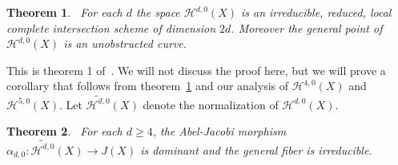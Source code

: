 \documentclass[amssymb,twoside,12 pt,amscd,reqno]{amsart}
\theoremstyle{plain}
\newtheorem{thm}{Theorem}[section]
\theoremstyle{definition}
\newcommand{\Hdg}[2]{\mathcal{H}^{#1,#2}}
\def\ps{\vspace{4pt}}
\begin{document}
\ps

\begin{thm}~\label{thm-irrd0}  For each $d$ the space $\Hdg{d}{0}(X)$
is an irreducible,  reduced, local complete intersection scheme of
dimension $2d$.  Moreover the general point of $\Hdg{d}{0}(X)$ is an
unobstructed curve.   
\end{thm}

This is theorem 1 of~\cite{HRS}.  We will not discuss the proof here,
but we will prove a corollary that follows from
theorem~\ref{thm-irrd0} and our analysis of $\Hdg{4}{0}(X)$ and
$\Hdg{5}{0}(X)$.  Let $\widetilde{\Hdg{d}{0}}(X)$ denote the normalization
of $\Hdg{d}{0}(X)$.

\ps

\begin{thm}~\label{thm-irrd02}  For each $d\geq 4$, the Abel-Jacobi
morphism $\alpha_{d,0}:\widetilde{\Hdg{d}{0}}(X)\rightarrow J(X)$ is
dominant and 
the general fiber is irreducible.
\end{thm}
\end{document}
